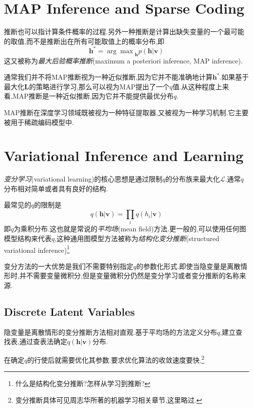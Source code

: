 \section{MAP Inference and Sparse Coding}

推断也可以指计算条件概率的过程.另外一种推断是计算出缺失变量的一个最可能的取值,而不是推断出在所有可能取值上的概率分布,即
\begin{equation}
\mathbf h^\ast={\arg\max}_{\mathbf h}p(\mathbf{h|v})
\end{equation}
这又被称为\textit{最大后验概率推断}(maximum a posteriori inference, MAP inference).

通常我们并不将MAP推断视为一种近似推断,因为它并不能准确地计算$\mathbf h^\ast$.如果基于最大化$\mathbf L$的策略进行学习,那么可以视为MAP提出了一个$q$值.从这种程度上来看,MAP推断是一种近似推断,因为它并不能提供最优分布$q$.

MAP推断在深度学习领域既被视为一种特征提取器,又被视为一种学习机制.它主要被用于稀疏编码模型中.

\section{Variational Inference and Learning}

\textit{变分学习}(variational learning)的核心思想是通过限制$q$的分布族来最大化$\mathcal L$.通常$q$分布相对简单或者具有良好的结构.

最常见的$q$的限制是
\begin{equation}
q(\mathbf{h|v})=\prod_iq(h_i|\mathbf v)
\end{equation}
即$q$为乘积分布.这也就是常说的\textit{平均场}(mean field)方法.更一般的,可以使用任何图模型结构来代表$q$,这种通用图模型方法被称为\textit{结构化变分推断}(structured variational inference)\footnote{什么是结构化变分推断?怎样从学习到推断?}

变分方法的一大优势是我们不需要特别指定$q$的参数化形式.即使当隐变量是离散情形时,并不需要变量微积分,但是变量微积分仍然是变分学习或者变分推断的名称来源.

\subsection{Discrete Latent Variables}

隐变量是离散情形的变分推断方法相对直观.基于平均场的方法定义分布$q$,建立查找表,通过查表法确定$q(\mathbf{h|v})$分布.

在确定$q$的行使后就需要优化其参数.要求优化算法的收敛速度要快.\footnote{变分推断具体可见周志华所著的机器学习相关章节,这里略过.}